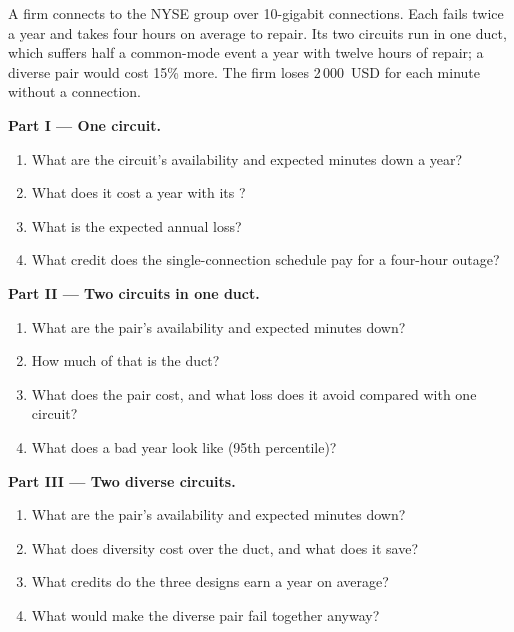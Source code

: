 \begin{problem}\label{pb:nw:buying-connectivity:1}
A firm connects to the NYSE group over 10-gigabit connections. Each fails twice a year and takes four hours on average to repair. Its two
circuits run in one duct, which suffers half a common-mode event a year with twelve hours of repair; a diverse pair would cost 15\% more. The firm
loses 2\,000~USD for each minute without a connection.

\medskip\noindent\textbf{Part I --- One circuit.}
\begin{enumerate}
\item What are the circuit's availability and expected minutes down a year?
\item What does it cost a year with its ?
\item What is the expected annual loss?
\item What credit does the single-connection schedule pay for a four-hour outage?
\end{enumerate}

\medskip\noindent\textbf{Part II --- Two circuits in one duct.}
\begin{enumerate}[resume]
\item What are the pair's availability and expected minutes down?
\item How much of that is the duct?
\item What does the pair cost, and what loss does it avoid compared with one circuit?
\item What does a bad year look like (95th percentile)?
\end{enumerate}

\medskip\noindent\textbf{Part III --- Two diverse circuits.}
\begin{enumerate}[resume]
\item What are the pair's availability and expected minutes down?
\item What does diversity cost over the duct, and what does it save?
\item What credits do the three designs earn a year on average?
\item What would make the diverse pair fail together anyway?
\end{enumerate}


\end{problem}
